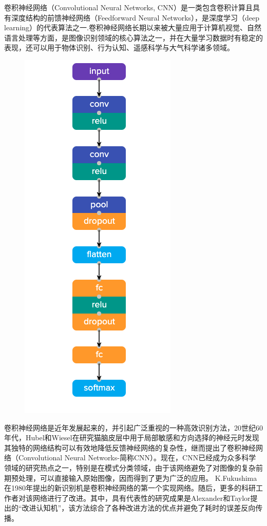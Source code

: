 \documentclass{progbookcn}
\begin{document}
 卷积神经网络（Convolutional Neural Networks, CNN）是一类包含卷积计算且具有深度结构的前馈神经网络（Feedforward Neural Networks），是深度学习（deep learning）的代表算法之一.卷积神经网络长期以来被大量应用于计算机视觉、自然语言处理等方面，是图像识别领域的核心算法之一，并在大量学习数据时有稳定的表现，还可以用于物体识别、行为认知、遥感科学与大气科学诸多领域。
\begin{figure}


\includegraphics[scale = 0.5]{cnn.png}

\end{figure}




卷积神经网络是近年发展起来的，并引起广泛重视的一种高效识别方法，20世纪60年代，Hubel和Wiesel在研究猫脑皮层中用于局部敏感和方向选择的神经元时发现其独特的网络结构可以有效地降低反馈神经网络的复杂性，继而提出了卷积神经网络（Convolutional Neural Networks-简称CNN）。现在，CNN已经成为众多科学领域的研究热点之一，特别是在模式分类领域，由于该网络避免了对图像的复杂前期预处理，可以直接输入原始图像，因而得到了更为广泛的应用。 K.Fukushima在1980年提出的新识别机是卷积神经网络的第一个实现网络。随后，更多的科研工作者对该网络进行了改进。其中，具有代表性的研究成果是Alexander和Taylor提出的“改进认知机”，该方法综合了各种改进方法的优点并避免了耗时的误差反向传播。
\end{document}
